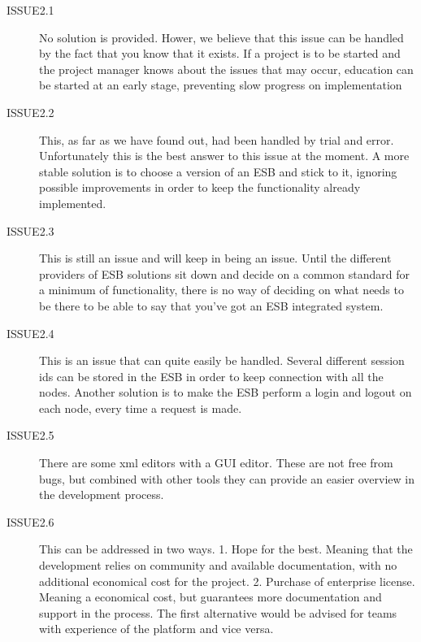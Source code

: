 \documentclass{llncs}
\begin{document}
\begin{description}
\begin{description}
\item[ISSUE2.1] No solution is provided. Hower, we believe that this issue can be handled by the fact that you know that it exists. If a project is to be started and the project manager knows about the issues that may occur, education can be started at an early stage, preventing slow progress on implementation
\item[ISSUE2.2] This, as far as we have found out, had been handled by trial and error. Unfortunately this is the best answer to this issue at the moment. A more stable solution is to choose a version of an ESB and stick to it, ignoring possible improvements in order to keep the functionality already implemented.
\item[ISSUE2.3] This is still an issue and will keep in being an issue. Until the different providers of ESB solutions sit down and decide on a common standard for a minimum of functionality, there is no way of deciding on what needs to be there to be able to say that you’ve got an ESB integrated system.
\item[ISSUE2.4] This is an issue that can quite easily be handled. Several different session ids can be stored in the ESB in order to keep connection with all the nodes. Another solution is to make the ESB perform a login and logout on each node, every time  a request is made.
\item[ISSUE2.5] There are some xml editors with a GUI editor. These are not free from bugs, but combined with other tools they can provide an easier overview in the development process.
\item[ISSUE2.6] This can be addressed in two ways. 1. Hope for the best. Meaning that the development relies on community and available documentation, with no additional economical cost for the project. 2. Purchase of enterprise license. Meaning a economical cost, but guarantees more documentation and support in the process. The first alternative would be advised for teams with experience of the platform and vice versa.
\end{description}

\end{description}
\end{document}
